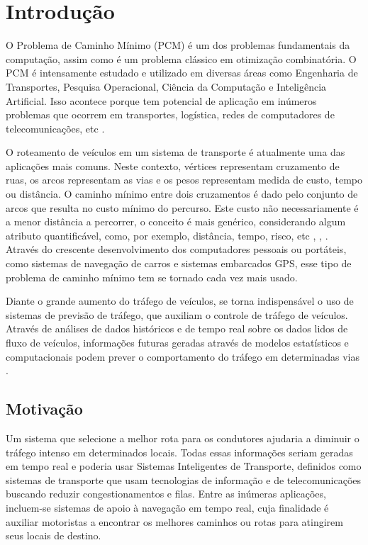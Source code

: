 \chapter{Introdução}

O Problema de Caminho Mínimo (PCM) é um dos problemas fundamentais da computação, assim como é um problema
clássico em otimização combinatória.
O PCM é intensamente estudado e utilizado em diversas áreas como Engenharia de Transportes, Pesquisa Operacional, Ciência
da Computação e Inteligência Artificial. Isso acontece porque tem potencial de aplicação em
inúmeros problemas que ocorrem em transportes, logística, redes de computadores de
telecomunicações, etc \cite{peer}.

O roteamento de veículos em um sistema de transporte é atualmente uma das aplicações mais comuns.
Neste contexto, vértices representam cruzamento de ruas, os arcos representam as vias
e os pesos representam medida de custo, tempo ou distância. O caminho mínimo entre dois cruzamentos
é dado pelo conjunto de arcos que resulta no custo mínimo do percurso.
Este custo não necessariamente é a menor distância a percorrer,
o conceito é mais genérico, considerando algum atributo quantificável, como,
por exemplo, distância, tempo, risco, etc \cite{boaventura}, \cite{cormen}, \cite{ziviani}.
Através do crescente desenvolvimento dos computadores pessoais ou portáteis, como sistemas
de navegação de carros e sistemas embarcados GPS, esse tipo de problema de caminho mínimo
tem se tornado cada vez mais usado.

Diante o grande aumento do tráfego de veículos, se torna indispensável o uso de sistemas
de previsão de tráfego, que auxiliam o controle de tráfego de veículos.
Através de análises de dados históricos e de tempo real sobre
os dados lidos de fluxo de veículos, informações futuras geradas através de modelos
estatísticos e computacionais podem prever o comportamento do tráfego em determinadas
vias \cite{leonard}.

\section{Motivação}

Um sistema que selecione a melhor rota para os condutores ajudaria a diminuir o tráfego intenso em determinados locais.
Todas essas informações seriam geradas em tempo real e poderia usar Sistemas Inteligentes de Transporte, definidos 
como sistemas de transporte que usam tecnologias de informação e
de telecomunicações buscando reduzir congestionamentos e filas.
Entre as inúmeras aplicações, incluem-se sistemas de apoio à navegação em tempo real, cuja finalidade é auxiliar
motoristas a encontrar os melhores caminhos ou rotas para atingirem seus locais de destino.

